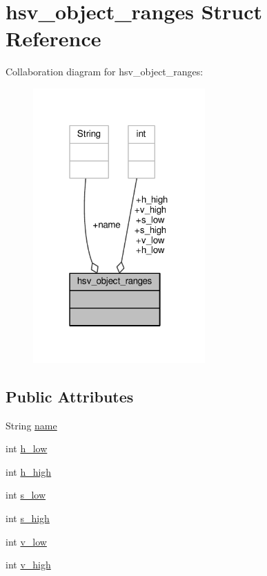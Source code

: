 \hypertarget{structhsv__object__ranges}{}\section{hsv\+\_\+object\+\_\+ranges Struct Reference}
\label{structhsv__object__ranges}


Collaboration diagram for hsv\+\_\+object\+\_\+ranges\+:
\nopagebreak
\begin{figure}[H]
\begin{center}
\leavevmode
\includegraphics[width=187pt]{structhsv__object__ranges__coll__graph}
\end{center}
\end{figure}
\subsection*{Public Attributes}
\begin{DoxyCompactItemize}
\item 
String \hyperlink{structhsv__object__ranges_a087e260cfb50d9490ad05633d11ded77}{name}
\item 
int \hyperlink{structhsv__object__ranges_a362302fe5abaf418c33c49639093974f}{h\+\_\+low}
\item 
int \hyperlink{structhsv__object__ranges_aa38c3a60afec73cadef5fa88dc839f0d}{h\+\_\+high}
\item 
int \hyperlink{structhsv__object__ranges_a88708aeb732887c5b8e2b5c0809de85c}{s\+\_\+low}
\item 
int \hyperlink{structhsv__object__ranges_ab49c867dfdfbcf720be3b75e2379f093}{s\+\_\+high}
\item 
int \hyperlink{structhsv__object__ranges_a2e1235a8053f3bd1ae5b1b183bd7ab8f}{v\+\_\+low}
\item 
int \hyperlink{structhsv__object__ranges_a00ca3df99b0bdeac1cb7157fc0e3fbf7}{v\+\_\+high}
\end{DoxyCompactItemize}


